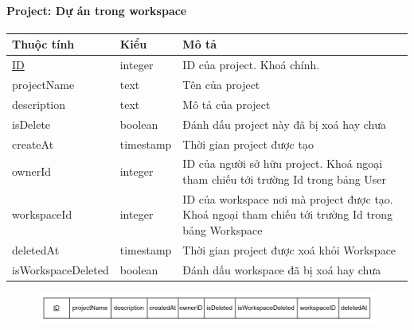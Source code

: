 \paragraph{Project: Dự án trong workspace}
\begin{center}
\begin{tabular}{ |p{4cm} |p{3cm} |p{7cm}|} 
 \hline
    Thuộc tính & Kiểu & Mô tả \\ [0.5ex] 
 \hline
 \underline{ID} & integer & ID của project. Khoá chính. \\ 
 \hline
 projectName & text & Tên của project \\
 \hline
 description & text & Mô tả của project \\
 \hline
 isDelete & boolean & Đánh dấu project này đã bị xoá hay chưa \\
 \hline
 createAt & timestamp & Thời gian project được tạo \\
 \hline
 ownerId & integer & ID của người sở hữu project.
 Khoá ngoại tham chiếu tới trường Id trong bảng User \\
 \hline
 workspaceId & integer & ID của workspace nơi mà project được tạo. Khoá ngoại tham chiếu tới trường Id trong bảng Workspace \\
 \hline
 deletedAt & timestamp & Thời gian project được xoá khỏi Workspace \\
 \hline
 isWorkspaceDeleted & boolean & Đánh dấu workspace đã bị xoá hay chưa \\
 \hline
\end{tabular}
\end{center}
\begin{figure}[h]
        \centering
        \includegraphics[width=\textwidth]{Content/Phân tích và thiết kế hệ thống/images/ERD_mapping/project_mapping.png}
        \label{fig:enter-label}
\end{figure}

